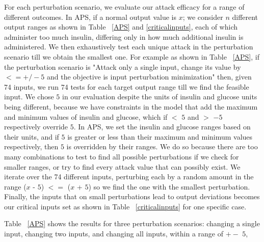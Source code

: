 For each perturbation scenario, we evaluate our attack efficacy for a range of different outcomes. 
 In \ac{APS}, if a normal output value is $x$; we consider $n$ different output ranges as shown in Table ~\ref{APS} and \ref{criticalinputs}, each of which administer too much insulin, differing only in how much additional insulin is administered.	
 We then exhaustively test each unique attack in the perturbation scenario till we obtain the smallest one.
 For example as shown in Table ~\ref{APS}, if the perturbation scenario is "Attack only a single input, change its value by $<= +/- 5$ and the objective is input perturbation minimization" then, given 74 inputs, we run 74 tests for each target output range till we find the feasible input. 
 We chose $5$ in our evaluation despite the units of insulin and glucose units being different, because we have constraints in the model that add the maximum and minimum values of insulin and glucose, which if $<$ $5$ and $>$ $-5$  respectively override $5$. 
 In \ac{APS}, we set the insulin and glucose ranges based on their units, and if $5$ is greater or less than their maximum and minimum values respectively, then $5$ is overridden by their ranges. 
 We do so because there are too many combinations to test to find all possible perturbations if we check for smaller ranges, or try to find every attack value that can possibly exist.   
 We iterate over the 74 different inputs, perturbing each by a random amount in the range ($x$ - $5$) $<=$ ($x$ + $5$) so we find the one with the smallest perturbation. 
 Finally, the inputs that on small perturbations lead to output deviations  becomes our critical inputs set as shown in Table ~\ref{criticalinputs} for one specific case. 
 
 
 Table ~\ref{APS} shows the results for three perturbation scenarios: changing a single input, changing two inputs, and changing all inputs, within a range of $+-$ $5$, %
 
